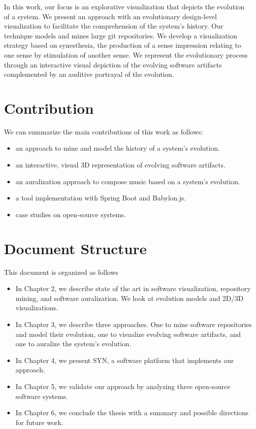 In this work, our focus is an explorative visualization that depicts the evolution of a system.
We present an approach with an evolutionary design-level visualization to facilitate the comprehension of the system's history. 
Our technique models and mines large git repositories. We develop a visualization strategy based on synesthesia, the production of a sense impression relating to one sense by stimulation of another sense. We represent the evolutionary process through an interactive visual depiction of the evolving software artifacts complemented by an auditive portrayal of the evolution. 

\section{Contribution}
We can summarize the main contributions of this work as follows:
\begin{itemize}
 \item an approach to mine and model the history of a system's evolution.
 \item an interactive, visual 3D representation of evolving software artifacts.
 \item an auralization approach to compose music based on a system's evolution.
 \item a tool implementation with Spring Boot and Babylon.js.
 \item case studies on open-source systems.
\end{itemize}


\section{Document Structure}
This document is organized as follows
\begin{itemize}
 \item In Chapter 2, we describe state of the art in software visualization, repository mining, and software auralization. We look at evolution models and 2D/3D visualizations. 
 \item In Chapter 3, we describe three approaches. One to mine software repositories and model their evolution, one to visualize evolving software artifacts, and one to auralize the system's evolution. 
 \item In Chapter 4, we present SYN, a software platform that implements our approach. 
 \item In Chapter 5, we validate our approach by analyzing three open-source software systems. 
 \item In Chapter 6, we conclude the thesis with a summary and possible directions for future work.
 \end{itemize}